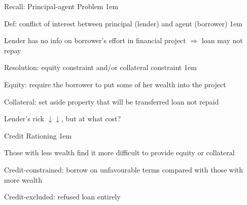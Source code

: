 \documentclass[11pt,aspectratio=43,usenames,dvipsnames]{beamer}
\let\olditemize=\itemize
\let\endolditemize=\enditemize
\renewenvironment{itemize}{\olditemize \itemsep1em}{\endolditemize}
\theoremstyle{definition}
\begin{document}
\begin{frame}{Recall: Principal-agent Problem}
\label{slide:Recall__Principal_agent_Problem}
    \begin{itemize}
        \item Def: conflict of interest between principal (\alert{lender}) and agent (\alert{borrower})
        \begin{itemize}
            \item Lender has no info on borrower's effort in financial project $ \Rightarrow  $ loan may not repay
        \end{itemize}
        \item Resolution: \alert{equity constraint} and/or \alert{collateral constraint}
        \begin{itemize}
            \item Equity: require the borrower to put some of her wealth into the project
            \item Collateral: set aside property that will be transferred loan not repaid
        \end{itemize}
        \item Lender's rick $ \downarrow \downarrow  $, but at what cost?
    \end{itemize}

\end{frame}

\begin{frame}{Credit Rationing}
\label{slide:Credit_Rationing}
    \begin{itemize}
        \item Those with less wealth find it more difficult to provide equity or collateral
        \item \alert{Credit-constrained}: borrow on unfavourable terms compared with those with more wealth
        \item \alert{Credit-excluded}: refused loan entirely
    \end{itemize}

\end{frame}
\end{document}
